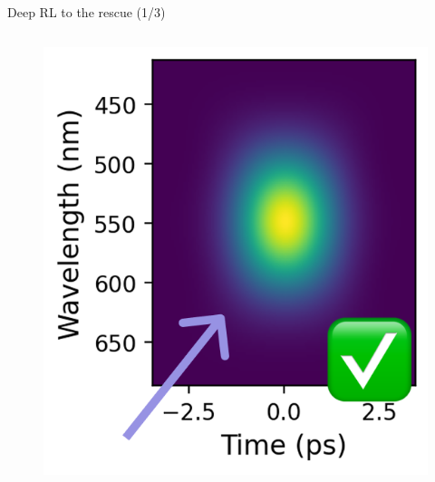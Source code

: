 \documentclass{beamer}
\begin{document}
\begin{frame}{Deep RL to the rescue (1/3)}
\begin{columns}[T,totalwidth=\textwidth]
\begin{column}{0.3\textwidth}
\begin{figure}
            \includegraphics[width=0.5\linewidth]{images/rl-sol-1.png}
        \end{figure}
    \end{column}
\end{columns}
\end{frame}
\end{document}
